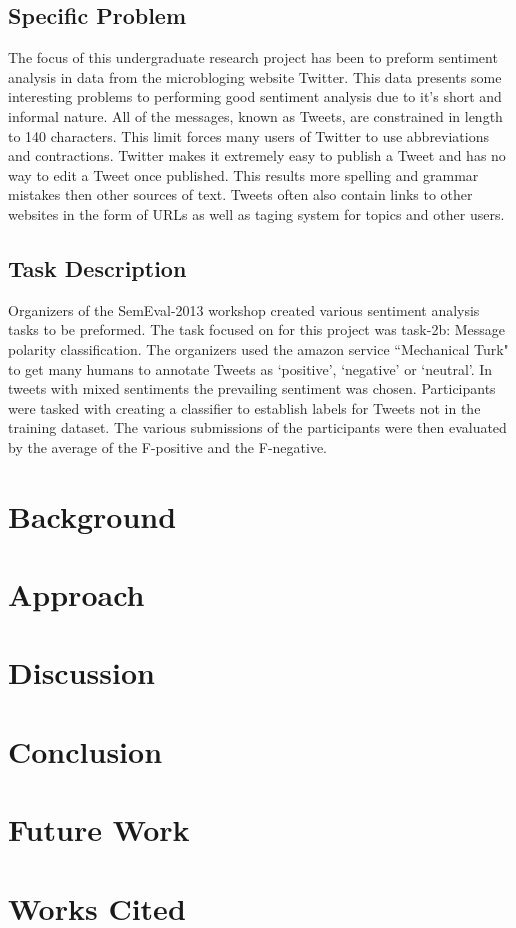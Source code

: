 \documentclass[12pt]{article}
\begin{document}

\subsection{Specific Problem}

The focus of this undergraduate research project has been to preform sentiment
analysis in data from the microbloging website Twitter. This data presents some
interesting problems to performing good sentiment analysis due to it's short
and informal nature. All of the messages, known as Tweets, are constrained in
length to 140 characters. This limit forces many users of Twitter to use
abbreviations and contractions. Twitter makes it extremely easy to publish a
Tweet and has no way to edit a Tweet once published. This results more spelling
and grammar mistakes then other sources of text. Tweets often also contain
links to other websites in the form of URLs as well as taging system for topics
and other users.

\subsection{Task Description}

Organizers of the SemEval-2013 workshop created various sentiment analysis
tasks to be preformed. The task focused on for this project was task-2b:
Message polarity classification. The organizers used the amazon service
``Mechanical Turk" to get many humans to annotate Tweets as `positive',
`negative' or `neutral'. In tweets with mixed sentiments the prevailing
sentiment was chosen. Participants were tasked with creating a classifier to
establish labels for Tweets not in the training dataset. The various
submissions of the participants were then evaluated by the average of the
F-positive and the F-negative.

\section{Background}

\section{Approach}

\section{Discussion}

\section{Conclusion}

\section{Future Work}

\section{Works Cited}
\end{document}

